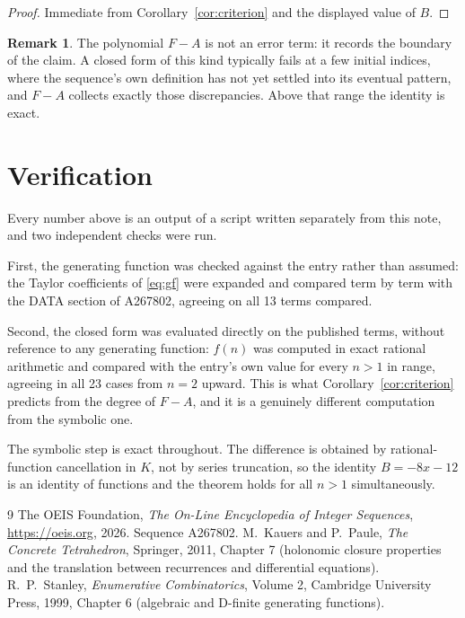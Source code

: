 \documentclass[11pt,a4paper]{article}
\theoremstyle{plain}
\theoremstyle{definition}
\newtheorem{remark}[theorem]{Remark}
\begin{document}
\begin{proof}
Immediate from Corollary~\ref{cor:criterion} and the displayed value of $B$.
\end{proof}

\begin{remark}
The polynomial $F-A$ is not an error term: it records the boundary of the claim. A closed
form of this kind typically fails at a few initial indices, where the sequence's own
definition has not yet settled into its eventual pattern, and $F-A$ collects exactly
those discrepancies. Above that range the identity is exact.
\end{remark}

\section{Verification}

Every number above is an output of a script written separately from this note, and two
independent checks were run.

First, the generating function was checked against the entry rather than assumed: the
Taylor coefficients of \eqref{eq:gf} were expanded and compared term by term with the DATA
section of A267802, agreeing on all 13 terms compared.

Second, the closed form was evaluated directly on the published terms, without reference
to any generating function: $f(n)$ was computed in exact rational arithmetic and compared
with the entry's own value for every $n>1$ in range, agreeing in all 23 cases
from $n=2$ upward. This is what Corollary~\ref{cor:criterion} predicts from the
degree of $F-A$, and it is a genuinely different computation from the symbolic one.

The symbolic step is exact throughout. The difference is obtained by rational-function
cancellation in $K$, not by series truncation, so the identity $B=- 8 x - 12$ is an
identity of functions and the theorem holds for all $n>1$ simultaneously.

\begin{thebibliography}{9}
 The OEIS Foundation, \emph{The On-Line Encyclopedia of Integer Sequences},
\url{https://oeis.org}, 2026. Sequence A267802.
 M.~Kauers and P.~Paule, \emph{The Concrete Tetrahedron}, Springer, 2011,
Chapter 7 (holonomic closure properties and the translation between recurrences and
differential equations).
 R.~P.~Stanley, \emph{Enumerative Combinatorics}, Volume 2, Cambridge
University Press, 1999, Chapter 6 (algebraic and D-finite generating functions).
\end{thebibliography}
\end{document}
